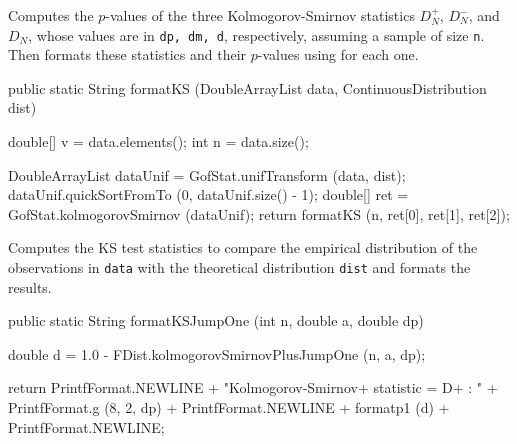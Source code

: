 \begin{tabb}  Computes the $p$-values of the three Kolmogorov-Smirnov statistics
  $D_N^+$, $D_N^-$, and $D_N$, whose values are in \texttt{dp, dm, d},
  respectively, assuming a sample of size \texttt{n}.
  Then formats these statistics and their $p$-values
  using  for each one.
\end{tabb}
\begin{htmlonly}
\end{htmlonly}
\begin{code}

   public static String formatKS (DoubleArrayList data,
                                  ContinuousDistribution dist)\begin{hide} {

      double[] v = data.elements();
      int n = data.size();

      DoubleArrayList dataUnif = GofStat.unifTransform (data, dist);
      dataUnif.quickSortFromTo (0, dataUnif.size() - 1);
      double[] ret = GofStat.kolmogorovSmirnov (dataUnif);
      return formatKS (n, ret[0], ret[1], ret[2]);
   }\end{hide}
\end{code}
\begin{tabb} Computes the KS test statistics to compare the
 empirical distribution of the observations in \texttt{data}
 with the theoretical distribution \texttt{dist} and
 formats the results.
\end{tabb}
\begin{htmlonly}
\end{htmlonly}
\begin{code}

   public static String formatKSJumpOne (int n, double a, double dp)\begin{hide} {
      double d = 1.0 - FDist.kolmogorovSmirnovPlusJumpOne (n, a, dp);

      return PrintfFormat.NEWLINE +
             "Kolmogorov-Smirnov+ statistic = D+    : " +
             PrintfFormat.g (8, 2, dp) + PrintfFormat.NEWLINE +
             formatp1 (d) + PrintfFormat.NEWLINE;
   }\end{hide}
\end{code}
